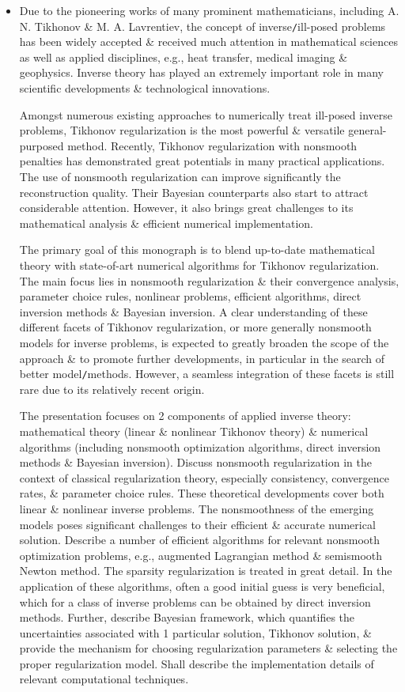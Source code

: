 \documentclass{article}
\begin{document}
\begin{itemize}
	\item Due to the pioneering works of many prominent mathematicians, including {\sc A. N. Tikhonov \& M. A. Lavrentiev}, the concept of inverse{\tt/}ill-posed problems has been widely accepted \& received much attention in mathematical sciences as well as applied disciplines, e.g., heat transfer, medical imaging \& geophysics. Inverse theory has played an extremely important role in many scientific developments \& technological innovations.
	
	Amongst numerous existing approaches to numerically treat ill-posed inverse problems, Tikhonov regularization is the most powerful \& versatile general-purposed method. Recently, Tikhonov regularization with nonsmooth penalties has demonstrated great potentials in many practical applications. The use of nonsmooth regularization can improve significantly the reconstruction quality. Their Bayesian counterparts also start to attract considerable attention. However, it also brings great challenges to its mathematical analysis \& efficient numerical implementation.
	
	The primary goal of this monograph is to blend up-to-date mathematical theory with state-of-art numerical algorithms for Tikhonov regularization. The main focus lies in nonsmooth regularization \& their convergence analysis, parameter choice rules, nonlinear problems, efficient algorithms, direct inversion methods \& Bayesian inversion. A clear understanding of these different facets of Tikhonov regularization, or more generally nonsmooth models for inverse problems, is expected to greatly broaden the scope of the approach \& to promote further developments, in particular in the search of better model{\tt/}methods. However, a seamless integration of these facets is still rare due to its relatively recent origin.
	
	The presentation focuses on 2 components of applied inverse theory: mathematical theory (linear \& nonlinear Tikhonov theory) \& numerical algorithms (including nonsmooth optimization algorithms, direct inversion methods \& Bayesian inversion). Discuss nonsmooth regularization in the context of classical regularization theory, especially consistency, convergence rates, \& parameter choice rules. These theoretical developments cover both linear \& nonlinear inverse problems. The nonsmoothness of the emerging models poses significant challenges to their efficient \& accurate numerical solution. Describe a number of efficient algorithms for relevant nonsmooth optimization problems, e.g., augmented Lagrangian method \& semismooth Newton method. The sparsity regularization is treated in great detail. In the application of these algorithms, often a good initial guess is very beneficial, which for a class of inverse problems can be obtained by direct inversion methods. Further, describe Bayesian framework, which quantifies the uncertainties associated with 1 particular solution, Tikhonov solution, \& provide the mechanism for choosing regularization parameters \& selecting the proper regularization model. Shall describe the implementation details of relevant computational techniques.
	

\end{itemize}
\end{document}
